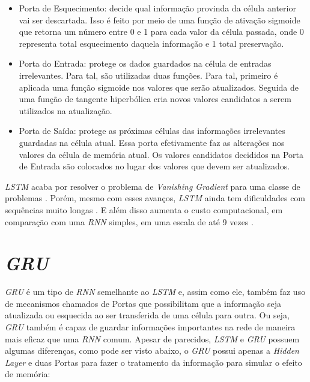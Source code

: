 \begin{itemize}
  \item Porta de Esquecimento: decide qual informação provinda da célula anterior vai ser descartada. Isso é feito por meio de uma função de ativação sigmoide que retorna um número entre 0 e 1 para cada valor da célula passada, onde 0 representa total esquecimento daquela informação e 1 total preservação.
  
  \item Porta do Entrada: protege os dados guardados na célula de entradas irrelevantes. Para tal, são utilizadas duas funções. Para tal, primeiro é aplicada uma função sigmoide nos valores que serão atualizados. Seguida de uma função de tangente hiperbólica cria novos valores candidatos a serem utilizados na atualização.
  
  \item Porta de Saída: protege as próximas células das informações irrelevantes guardadas na célula atual. Essa porta efetivamente faz as alterações nos valores da célula de memória atual. Os valores candidatos decididos na Porta de Entrada são colocados no lugar dos valores que devem ser atualizados.
\end{itemize}

\textit{\acrshort{LSTM}} acaba por resolver o problema de \textit{Vanishing Gradient} para uma classe de problemas \cite{doi:10.1162/neco.1997.9.8.1735}. Porém, mesmo com esses avanços, \textit{\acrshort{LSTM}} ainda tem dificuldades com sequências muito longas \cite{alex2012}. E além disso aumenta o custo computacional, em comparação com uma \textit{\acrshort{RNN}} simples, em uma escala de até 9 vezes \cite{doi:10.1162/neco.1997.9.8.1735}.

\section{\textit{\acrfull{GRU}}}





\textit{\acrshort{GRU}} é um tipo de \textit{\acrshort{RNN}} semelhante ao \textit{\acrshort{LSTM}} e, assim como ele, também faz uso de mecanismos chamados de Portas que possibilitam que a informação seja atualizada ou esquecida ao ser transferida de uma célula para outra. Ou seja, \textit{\acrshort{GRU}} também é capaz de guardar informações importantes na rede de maneira mais eficaz que uma \textit{\acrshort{RNN}} comum. Apesar de parecidos, \textit{\acrshort{LSTM}} e \textit{\acrshort{GRU}} possuem algumas diferenças, como pode ser visto abaixo, o \textit{\acrshort{GRU}} possui apenas a \textit{Hidden Layer} e duas Portas para fazer o tratamento da informação para simular o efeito de memória:

